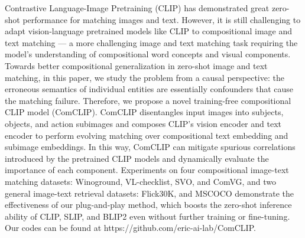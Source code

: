 Contrastive Language-Image Pretraining (CLIP) has demonstrated great zero-shot performance for matching images and text. However, it is still challenging to adapt vision-language pretrained models like CLIP to compositional image and text matching --- a more challenging image and text matching task requiring the model's understanding of compositional word concepts and visual components. Towards better compositional generalization in zero-shot image and text matching, in this paper, we study the problem from a causal perspective: the erroneous semantics of individual entities are essentially confounders that cause the matching failure. Therefore, we propose a novel training-free compositional CLIP model (ComCLIP). ComCLIP disentangles input images into subjects, objects, and action subimages and composes CLIP's vision encoder and text encoder to perform evolving matching over compositional text embedding and subimage embeddings. In this way, ComCLIP can mitigate spurious correlations introduced by the pretrained CLIP models and dynamically evaluate the importance of each component. Experiments on four compositional image-text matching datasets: Winoground, VL-checklist, SVO, and ComVG, and two general image-text retrieval datasets: Flick30K, and MSCOCO demonstrate the effectiveness of our plug-and-play method, which boosts the zero-shot inference ability of CLIP, SLIP, and BLIP2 even without further training or fine-tuning. Our codes can be found at https://github.com/eric-ai-lab/ComCLIP.